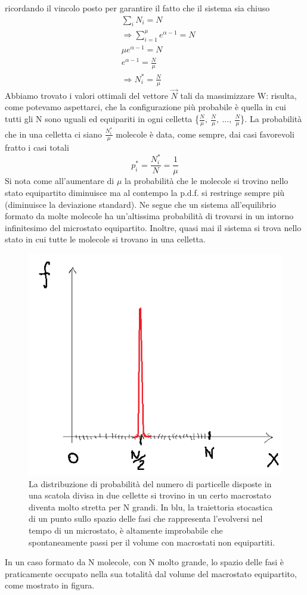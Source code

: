 \documentclass[
10pt, %
a4paper, %
oneside, %
headinclude,footinclude, %
BCOR5mm, %
]{scrartcl}
\begin{document}
ricordando il vincolo posto per garantire il fatto che il sistema sia chiuso
\begin{align*}
	&\sum_iN_i =N\\
	&\Rightarrow \sum_{i=1}^{\mu}e^{\alpha - 1}=N\\
	&\mu e^{\alpha -1}=N\\
	&e^{\alpha - 1}=\frac{N}{\mu}\\
	&\Rightarrow N_i^* = \frac{N}{\mu}
\end{align*}
Abbiamo trovato i valori ottimali del vettore $\vec{N}$ tali da massimizzare W: risulta, come potevamo aspettarci, che la configurazione più probabile è quella in cui tutti gli N sono uguali ed equipariti in ogni celletta \{$\frac{N}{\mu},\ \frac{N}{\mu},\ ...,\ \frac{N}{\mu} $\}. La probabilità che in una celletta ci siano $\frac{N_i^*}{\mu}$ molecole è data, come sempre, dai casi favorevoli fratto i casi totali
\[p_i^*=\frac{N_i^*}{N}=\frac{1}{\mu}\]
Si nota come all'aumentare di $\mu$ la probabilità che le molecole si trovino nello stato equipartito diminuisce ma al contempo la p.d.f. si restringe sempre più (diminuisce la deviazione standard). Ne segue che un sistema all'equilibrio formato da molte molecole ha un'altissima probabilità di trovarsi in un intorno infinitesimo del microstato equipartito. Inoltre, quasi mai il sistema si trova nello stato in cui tutte le molecole si trovano in una celletta. 

\begin{figure}[h!]
	\centering
	\includegraphics[width=0.4\linewidth]{"../images/caso ad N"}
	\caption{La distribuzione di probabilità del numero di particelle disposte in una scatola divisa in due cellette si trovino in un certo macrostato diventa molto stretta per N grandi. In blu, la traiettoria stocastica di un punto sullo spazio delle fasi che rappresenta l'evolversi nel tempo di un microstato, è altamente improbabile che spontaneamente passi per il volume con macrostati non equipartiti. }
	\label{fig:caso-ad-n}
\end{figure}
\FloatBarrier
In un caso formato da N molecole, con N molto grande, lo spazio delle fasi è praticamente occupato nella sua totalità dal volume del macrostato equipartito, come mostrato in figura. 
\end{document}
